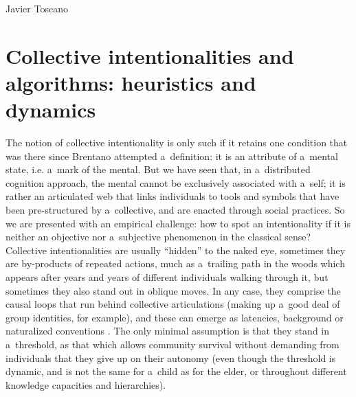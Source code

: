 \begin{artengenv}{Javier Toscano}
\section*{Collective intentionalities and algorithms: heuristics and dynamics}
The notion of collective intentionality is only such if it retains one condition that was there since Brentano attempted a~definition: it is an attribute of a~mental state, i.e. a~mark of the mental. But we have seen that, in a~distributed cognition approach, the mental cannot be exclusively associated with a~self; it is rather an articulated web that links individuals to tools and symbols that have been pre-structured by a~collective, and are enacted through social practices. So we are presented with an empirical challenge: how to spot an intentionality if it is neither an objective nor a~subjective phenomenon in the classical sense? Collective intentionalities are usually ``hidden'' to the naked eye, sometimes they are by-products of repeated actions, much as a~trailing path in the woods which appears after years and years of different individuals walking through it, but sometimes they also stand out in oblique moves. In any case, they comprise the causal loops that run behind collective articulations (making up a~good deal of group identities, for example), and these can emerge as latencies, background or naturalized conventions
\parencites[a specialized analysis in][]{chant_individual_2014}[in relation to this topic see also][]{toscano_intentionalities_nodate}. %
 The only minimal assumption is that they stand in a~threshold, as that which allows community survival without demanding from individuals that they give up on their autonomy (even though the threshold is dynamic, and is not the same for a~child as for the elder, or throughout different knowledge capacities and hierarchies).


\end{artengenv}
